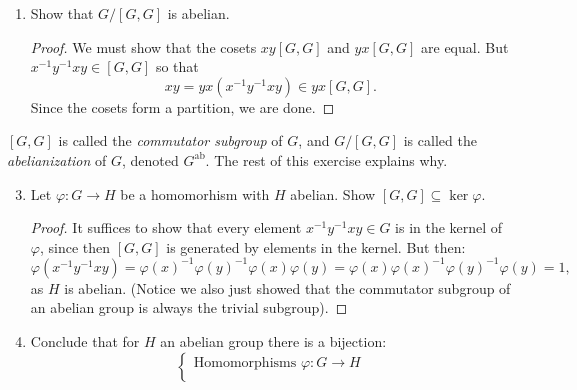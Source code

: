 \documentclass[11pt]{article}
\newtheorem{lemma}{Lemma}
\newcommand{\ab}{\mathrm{ab}}
\begin{document}
\begin{enumerate}
\begin{enumerate}
\begin{proof}
      We concluded the proof above, but there is a slightly slicker way to see this, following from the next lemma.
      \begin{lemma}
        Let $\varphi:H\to K$ is a homomorphism of groups.  Then the image of a commutator is a commutator.
      \end{lemma}
      \begin{proof}
        This is immediate, as $\varphi(x^{-1}y^{-1}xy) = \varphi(x)^{-1}\varphi(y)^{-1}\varphi(x)\varphi(y)$.
      \end{proof}
      Then we need only notice that for every $g\in G$, the conjugation map $\varphi_g:G\to G$ given by $\varphi_g(x) = gxg^{-1}$ is a homomorphism.  But we showed this in class: indeed,
      \[\varphi_g(xy) = gxyg^{-1} = gxg^{-1}gyg^{-1} = \varphi_g(x)\varphi_g(y).\]
      Then we immediatly conclude that conjugating a commutator gives a commutator.
    \end{proof}
    \item Show that $G/[G,G]$ is abelian.
    \begin{proof}
      We must show that the cosets $xy[G,G]$ and $yx[G,G]$ are equal.  But $x^{-1}y^{-1}xy\in[G,G]$ so that
      \[xy = yx(x^{-1}y^{-1}xy)\in yx[G,G].\]
      Since the cosets form a partition, we are done.
    \end{proof}
  \end{enumerate}
  $[G,G]$ is called the \textit{commutator subgroup} of $G$, and $G/[G,G]$ is called the \textit{abelianization} of $G$, denoted $G^\ab$.  The rest of this exercise explains why.
  \begin{enumerate}
    \setcounter{enumii}{2}
    \item Let $\varphi:G\to H$ be a homomorhism with $H$ abelian.  Show $[G,G]\subseteq\ker\varphi$.
    \begin{proof}
      It suffices to show that every element $x^{-1}y^{-1}xy\in G$ is in the kernel of $\varphi$, since then $[G,G]$ is generated by elements in the kernel.  But then:
      \[\varphi(x^{-1}y^{-1}xy) = \varphi(x)^{-1}\varphi(y)^{-1}\varphi(x)\varphi(y) = \varphi(x)\varphi(x)^{-1}\varphi(y)^{-1}\varphi(y)=1,\]
      as $H$ is abelian.  (Notice we also just showed that the commutator subgroup of an abelian group is always the trivial subgroup).
    \end{proof}
    \item Conclude that for $H$ an abelian group there is a bijection:
    \[\left\{
    \begin{array}{c}
      \text{Homomorphisms }\varphi:G\to H\\

\end{array}\]
\end{enumerate}
\end{enumerate}
\end{document}

